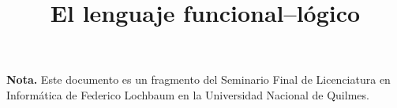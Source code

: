 \documentclass{article}
\title{El lenguaje funcional–lógico \nuflo}
\author{}
\begin{document}
{\bf Nota.} Este documento es un fragmento del Seminario Final de
Licenciatura en Informática de Federico Lochbaum
en la Universidad Nacional de Quilmes.


\end{document}
